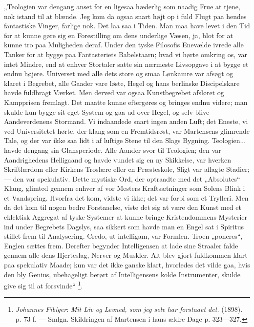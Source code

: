 \documentclass[12pt,a4paper,openany]{book}
\newcommand{\opage}[1]{\marginnote{\footnotesize\textit{[#1]}}}
\begin{document}
„Teologien var dengang anset for en ligesaa hæderlig som naadig Frue at tjene,
nok istand til at blænde. Jeg kom da ogsaa snart højt op i fuld Flugt paa
hendes fantastiske Vinger, farlige nok. Det laa saa i Tiden. Man maa have levet
i den Tid for at kunne gøre sig en Forestilling om dens underlige Væsen, ja,
blot for at kunne tro paa Muligheden deraf. Under den tyske Filosofis Enevælde
ivrede alle Tanker for at bygge paa Fantasteriets Babelstaarn; hvad vi hørte
omkring os, var intet Mindre, end at enhver Stortaler satte sin nærmeste
Livsopgave i at bygge et endnu højere. Universet med alle dets store og smaa
Lønkamre var afsøgt og klaret i Begrebet, alle Gaader vare løste, Hegel og hans
berlinske Discipelskare havde fuldbragt Værket. Men derved var ogsaa
Kunstbegrebet afsløret og Kampprisen fremlagt. Det maatte kunne eftergøres og
bringes endnu videre; man skulde kun bygge sit eget System og gaa ud over
Hegel, og selv blive Aandeverdenens Stormand. Vi indaandede snart ingen anden
Luft; det Eneste,
\setcounter{footnote}{0}%
\opage{143}vi ved Universitetet hørte, der klang som en Fremtidsrøst, var
Martensens glimrende Tale, og der var ikke saa lidt i af luftige Stene til den
Slags Bygning. Teologien... havde dengang sin Glansperiode. Alle Aander svor
til Teologien; den var Aandrighedens Helligaand og havde vundet sig en ny
Skikkelse, var hverken Skriftlærdom eller Kirkens Troslære eller en
Præsteskole, Sligt var aflagte Stadier; --- den var spekulativ. Dette mystiske
Ord, der optraadte med det „Absolutes“ Klang, glimted gennem enhver af vor
Mesters Kraftsætninger som Solens Blink i et Vandspring. Hvorfra det kom,
vidste vi ikke; det var forbi som et Trylleri. Men da det kom til nogen bedre
Forstaaelse, viste det sig at være den Kunst med et eklektisk Aggregat af tyske
Systemer at kunne bringe Kristendommens Mysterier ind under Begrebets Dagslys,
saa sikkert som havde man en Engel sat i Spiritus stillet frem til Analysering.
Credo, ut intelligam, var Formlen. Troen „poneres“, Englen sættes frem.
Derefter begynder Intelligensen at lade sine Straaler falde gennem alle dens
Hjerteslag, Nerver og Muskler. Alt blev gjort fuldkommen klart paa spekulativ
Maade; kun var det ikke ganske klart, hvorledes det vilde gaa, hvis den bly
Genius, ubehageligt berørt af Intelligensens kolde Instrumenter, skulde give
sig til at forsvinde“%
\footnote[1]{\emph{Johannes} \emph{Fibiger}: \textit{Mit Liv og Levned, som jeg
selv har forstaaet det.} (1898). p. 73 f. --- Smlgn. Skildringen af Martensen i
hans ældre Dage p. 323---327.}.
\end{document}
